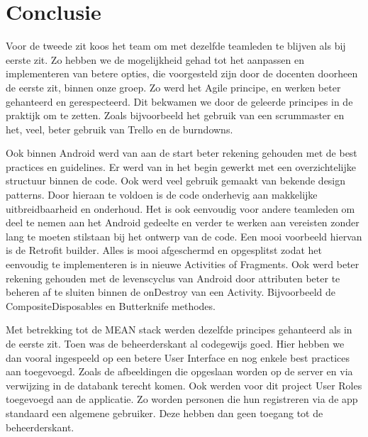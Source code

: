 \chapter{Conclusie}
\label{ch:conclusie}

Voor de tweede zit koos het team om met dezelfde teamleden te blijven als bij eerste zit. Zo hebben we de mogelijkheid gehad tot het aanpassen en implementeren van betere opties, die voorgesteld zijn door de docenten doorheen de eerste zit, binnen onze groep. Zo werd het Agile principe, en werken beter gehanteerd en gerespecteerd. Dit bekwamen we door de geleerde principes in de praktijk om te zetten. Zoals bijvoorbeeld het gebruik van een scrummaster en het, veel, beter gebruik van Trello en de burndowns.

Ook binnen Android werd van aan de start beter rekening gehouden met de best practices en guidelines. Er werd van in het begin gewerkt met een overzichtelijke structuur binnen de code. Ook werd veel gebruik gemaakt van bekende design patterns. Door hieraan te voldoen is de code onderhevig aan makkelijke uitbreidbaarheid en onderhoud. Het is ook eenvoudig voor andere teamleden om deel te nemen aan het Android gedeelte en verder te werken aan vereisten zonder lang te moeten stilstaan bij het ontwerp van de code. Een mooi voorbeeld hiervan is de Retrofit builder. Alles is mooi afgeschermd en opgesplitst zodat het eenvoudig te implementeren is in nieuwe Activities of Fragments. Ook werd beter rekening gehouden met de levenscyclus van Android door attributen beter te beheren af te sluiten binnen de onDestroy van een Activity. Bijvoorbeeld de CompositeDisposables en Butterknife methodes.

Met betrekking tot de MEAN stack werden dezelfde principes gehanteerd als in de eerste zit. Toen was de beheerderskant al codegewijs goed. Hier hebben we dan vooral ingespeeld op een betere User Interface en nog enkele best practices aan toegevoegd. Zoals de afbeeldingen die opgeslaan worden op de server en via verwijzing in de databank terecht komen. Ook werden voor dit project User Roles toegevoegd aan de applicatie. Zo worden personen die hun registreren via de app standaard een algemene gebruiker. Deze hebben dan geen toegang tot de beheerderskant.